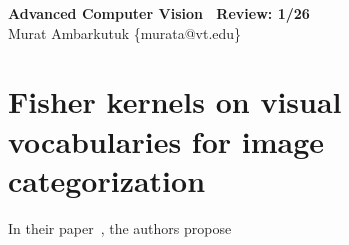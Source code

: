 \documentclass[11pt]{article}
\begin{document}
\begin{center}
	\textbf{\huge{Advanced Computer Vision \textemdash~Review: 1/26}} \\
	\bigskip
	\large{Murat Ambarkutuk \{murata@vt.edu\}}
\end{center}
\section{Fisher kernels on visual vocabularies for image categorization}
In their paper~\cite{perronnin2007fisher}, the authors propose



\end{document}
